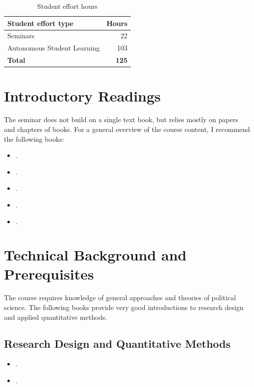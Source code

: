 \documentclass[abstract=on,parskip=full,headings=standardclasses,fontsize=11pt,paper=a4]{scrartcl}
\begin{document}
\begin{table}[h] \centering \onehalfspacing
\caption*{Student effort hours}
\begin{tabular}{ l r} 
\toprule
Student effort type &  Hours \\
\midrule
Seminars & 22 \\
Autonomous Student Learning  & 103 \\
\textbf{Total} & \textbf{125} \\
\bottomrule
\end{tabular}
\end{table}




\section*{Introductory Readings}

The seminar does not build on a single text book, but relies mostly on papers and chapters of books. For  a general overview of the course content, I recommend the following books:

\begin{itemize}
\item {}.
\item {}.
\item {}.
\item {}.
\item {}.
\end{itemize}




\section*{Technical Background and Prerequisites}

The course requires knowledge of general approaches and theories of political science. The following books provide very good introductions to research design and applied quantitative methods.

\subsection*{Research Design and Quantitative Methods}
\begin{itemize}
\item {}.
\item {}.
\end{itemize}
\end{document}
